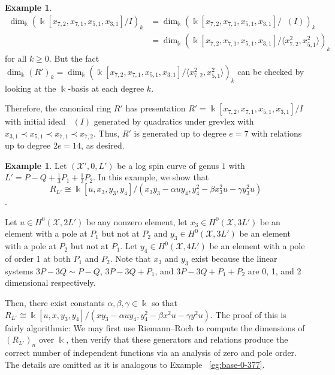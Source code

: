 \documentclass{amsart}
\theoremstyle{plain}
\theoremstyle{definition}
\newtheorem{example}[thm]{Example}
\theoremstyle{remark}
\numberwithin{equation}{section}
\newcommand\Bk{{\Bbbk}}
\newcommand\sx{\mathscr X}
\newcommand{\halfcan}{L}
\DeclareMathOperator{\initial}{in_\prec}
\begin{document}
\begin{example}
\begin{align*}
	\dim_\Bk \left(\Bk[x_{7, 2}, x_{7, 1}, x_{5, 1}, x_{3, 1}] / I\right)_k &=
	\dim_\Bk \left(\Bk[x_{7, 2}, x_{7, 1}, x_{5, 1}, x_{3, 1}]	/ \initial(I)\right)_k \\
	&= \dim_\Bk \left(\Bk[x_{7, 2}, x_{7, 1}, x_{5, 1}, x_{3, 1}] / \langle
	x_{7, 2}^2, x_{5, 1}^2 \rangle \right)_k
\end{align*}
\noindent
for all $k \geq 0$. But the fact $\dim_\Bk (R')_k = \dim_\Bk \left(\Bk[x_{7, 2},
x_{7, 1}, x_{5, 1}, x_{3, 1}] / \langle x_{7, 2}^2, x_{5, 1}^2
\rangle\right)_k$ can be checked by looking at the $\Bk$-basis at each degree
$k$.

Therefore, the canonical ring $R'$ has presentation $R' =
\Bk[x_{7, 2}, x_{7, 1}, x_{5, 1}, x_{3, 1}] / I$ with
initial ideal $\initial(I)$ generated by quadratics under grevlex
with $x_{3,1} \prec x_{5,1} \prec x_{7,1} \prec x_{7,2}$.
Thus, $R'$ is generated up to degree $e = 7$ with relations up to
degree $2e = 14$, as desired.
\end{example}

\begin{example}
\label{eg:base-1-33}
Let $(\sx',0 , \halfcan')$ be a log spin curve of genus $1$ with $\halfcan' = P - Q + \frac{1}{3}P_1 + \frac{1}{3}P_2$. In this example, we show that
$$R_{\halfcan'} \cong \Bk[u, x_3, y_3, y_4]/(x_3 y_3- \alpha uy_4, y_4^2 - \beta x_3^2 u - \gamma y_3^2u)$$.

Let $u \in H^0(\sx,2\halfcan')$ be any nonzero element, let $x_3 \in H^0(\sx,3\halfcan')$ be an element with a pole at $P_1$ but not at $P_2$ and $y_3 \in H^0(\sx,3\halfcan')$ be an element with a pole at $P_2$ but not at $P_1$. Let $y_4 \in H^0(\sx,4\halfcan')$ be an element with a pole of order 1 at both $P_1$ and $P_2$. Note that $x_3$ and $y_3$ exist because the linear systems $3P - 3Q \sim P - Q$, $3P - 3Q + P_1$, and $3P - 3Q + P_1 + P_2$ are 0, 1, and 2 dimensional respectively.

Then, there exist constants $\alpha, \beta, \gamma \in \Bk$ so that 
$R_{\halfcan'} \cong \Bk[u, x, y_3, y_4]/(xy_3- \alpha uy_4, y_4^2 - \beta x^2 u - \gamma y^2u).$ The proof of this is fairly algorithmic: We may first use Riemann--Roch to compute the dimensions of $(R_{\halfcan'})_n$ over $\Bk$, then verify that these generators and relations produce the correct number of independent functions via an analysis of zero and pole order. The details are omitted as it is analogous to Example ~\ref{eg:base-0-377}.
\end{example}
\end{document}

